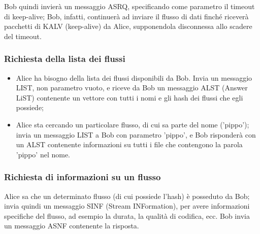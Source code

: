 Bob quindi invierà un messaggio ASRQ, specificando come parametro il timeout di
keep-alive; Bob, infatti, continuerà ad inviare il flusso di dati finché riceverà
pacchetti di KALV (keep-alive) da Alice, supponendola disconnessa allo scadere
del timeout.






\subsubsection{Richiesta della lista dei flussi}
%

\begin{itemize}
\item Alice ha bisogno della lista dei flussi disponibili da Bob. Invia un messaggio LIST, non parametro vuoto, e riceve da Bob un messaggio ALST (Answer LiST) contenente un vettore con tutti i nomi e gli hash dei flussi che egli possiede;
\item Alice sta cercando un particolare flusso, di cui sa parte del nome
('pippo'); invia un messaggio LIST a Bob con parametro 'pippo', e Bob
risponderà con un ALST contenente informazioni su tutti i file che contengono la
parola 'pippo' nel nome.
\end{itemize}




\subsubsection{Richiesta di informazioni su un flusso}
%

Alice sa che un determinato flusso (di cui possiede l'hash) è posseduto da Bob;
invia quindi un messaggio SINF (Stream INFormation), per avere informazioni
specifiche del flusso, ad esempio la durata, la qualità di codifica, ecc. Bob
invia un messaggio ASNF contenente la risposta.



